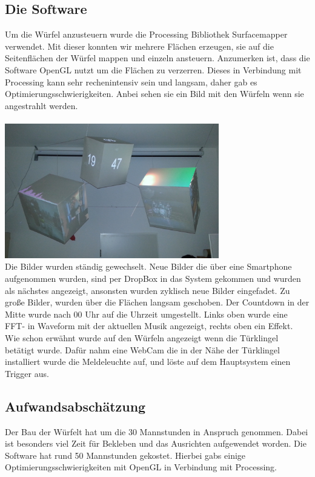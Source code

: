 \documentclass[pdftex,12pt,a4paper]{report}
\begin{document}
\subsection{Die Software}
Um die Würfel anzusteuern wurde die Processing Bibliothek Surfacemapper verwendet. Mit dieser konnten wir mehrere Flächen erzeugen, sie auf die Seitenflächen der Würfel mappen und einzeln ansteuern. Anzumerken ist, dass die Software OpenGL nutzt um die Flächen zu verzerren. Dieses in Verbindung mit Processing kann sehr rechenintensiv sein und langsam, daher gab es  Optimierungsschwierigkeiten. Anbei sehen sie ein Bild mit den Würfeln wenn sie angestrahlt werden.
\\ \\
\includegraphics[width=0.7\textwidth]{./wuerfel_angestrahlt}\\[1cm]   
Die Bilder wurden ständig gewechselt. Neue Bilder die über eine Smartphone aufgenommen wurden, sind per DropBox in das System gekommen und wurden als nächstes angezeigt, ansonsten wurden zyklisch neue Bilder eingefadet. Zu große Bilder, wurden über die Flächen langsam geschoben. 
Der Countdown in der Mitte wurde nach 00 Uhr auf die Uhrzeit umgestellt. Links oben wurde eine FFT- in Waveform mit der aktuellen Musik angezeigt, rechts oben ein Effekt.
Wie schon erwähnt wurde auf den Würfeln angezeigt wenn die Türklingel betätigt wurde. Dafür nahm eine WebCam die in der Nähe der Türklingel installiert wurde die Meldeleuchte auf, und löste auf dem Hauptsystem einen Trigger aus.

\subsection{Aufwandsabschätzung}
Der Bau der Würfelt hat um die 30 Mannstunden in Anspruch genommen. Dabei ist besonders viel Zeit für Bekleben und das Ausrichten aufgewendet worden. Die Software hat rund 50 Mannstunden gekostet. Hierbei gabs einige Optimierungsschwierigkeiten mit OpenGL in Verbindung mit Processing.
\end{document}
